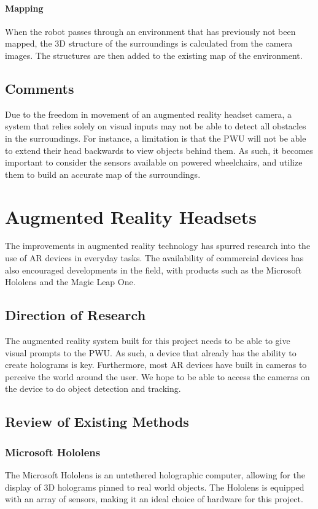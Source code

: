 \paragraph{Mapping}
When the robot passes through an environment that has previously not been mapped, the 3D structure of the surroundings is calculated from the camera images. The structures are then added to the existing map of the environment.

\subsection{Comments}
Due to the freedom in movement of an augmented reality headset camera, a system that relies solely on visual inputs may not be able to detect all obstacles in the surroundings. For instance, a limitation is that the PWU will not be able to extend their head backwards to view objects behind them. As such, it becomes important to consider the sensors available on powered wheelchairs, and utilize them to build an accurate map of the surroundings.

\section{Augmented Reality Headsets}
The improvements in augmented reality technology has spurred research into the use of AR devices in everyday tasks. The availability of commercial devices has also encouraged developments in the field, with products such as the Microsoft Hololens and the Magic Leap One.

\subsection{Direction of Research}
The augmented reality system built for this project needs to be able to give visual prompts to the PWU. As such, a device that already has the ability to create holograms is key. Furthermore, most AR devices have built in cameras to perceive the world around the user. We hope to be able to access the cameras on the device to do object detection and tracking.

\subsection{Review of Existing Methods}

\subsubsection{Microsoft Hololens}
The Microsoft Hololens is an untethered holographic computer, allowing for the display of 3D holograms pinned to real world objects. The Hololens is equipped with an array of sensors, making it an ideal choice of hardware for this project.

